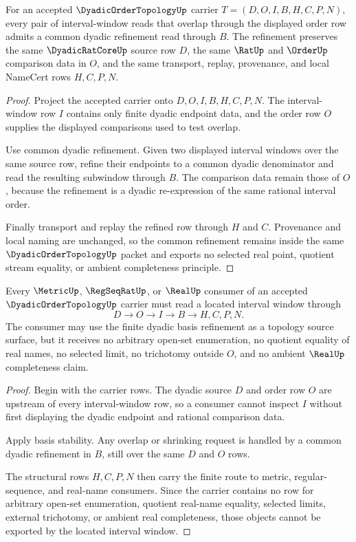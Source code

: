 \begin{theorem}
\label{thm:dyadic-order-topology-basis-stability}
For an accepted $\DyadicOrderTopologyUp$ carrier $T=(D,O,I,B,H,C,P,N)$, every pair of interval-window reads that overlap through the displayed order row admits a common dyadic refinement read through $B$. The refinement preserves the same $\DyadicRatCoreUp$ source row $D$, the same $\RatUp$ and $\OrderUp$ comparison data in $O$, and the same transport, replay, provenance, and local NameCert rows $H,C,P,N$.
\end{theorem}
\begin{proof}
Project the accepted carrier onto $D,O,I,B,H,C,P,N$. The interval-window row $I$ contains only finite dyadic endpoint data, and the order row $O$ supplies the displayed comparisons used to test overlap.

Use common dyadic refinement. Given two displayed interval windows over the same source row, refine their endpoints to a common dyadic denominator and read the resulting subwindow through $B$. The comparison data remain those of $O$, because the refinement is a dyadic re-expression of the same rational interval order.

Finally transport and replay the refined row through $H$ and $C$. Provenance and local naming are unchanged, so the common refinement remains inside the same $\DyadicOrderTopologyUp$ packet and exports no selected real point, quotient stream equality, or ambient completeness principle.
\end{proof}

\begin{theorem}
\label{thm:dyadic-order-topology-located-interval-window}
Every $\MetricUp$, $\RegSeqRatUp$, or $\RealUp$ consumer of an accepted $\DyadicOrderTopologyUp$ carrier must read a located interval window through
$$
D \longrightarrow O \longrightarrow I \longrightarrow B \longrightarrow H,C,P,N .
$$
The consumer may use the finite dyadic basis refinement as a topology source surface, but it receives no arbitrary open-set enumeration, no quotient equality of real names, no selected limit, no trichotomy outside $O$, and no ambient $\RealUp$ completeness claim.
\end{theorem}
\begin{proof}
Begin with the carrier rows. The dyadic source $D$ and order row $O$ are upstream of every interval-window row, so a consumer cannot inspect $I$ without first displaying the dyadic endpoint and rational comparison data.

Apply basis stability. Any overlap or shrinking request is handled by a common dyadic refinement in $B$, still over the same $D$ and $O$ rows.

The structural rows $H,C,P,N$ then carry the finite route to metric, regular-sequence, and real-name consumers. Since the carrier contains no row for arbitrary open-set enumeration, quotient real-name equality, selected limits, external trichotomy, or ambient real completeness, those objects cannot be exported by the located interval window.
\end{proof}

